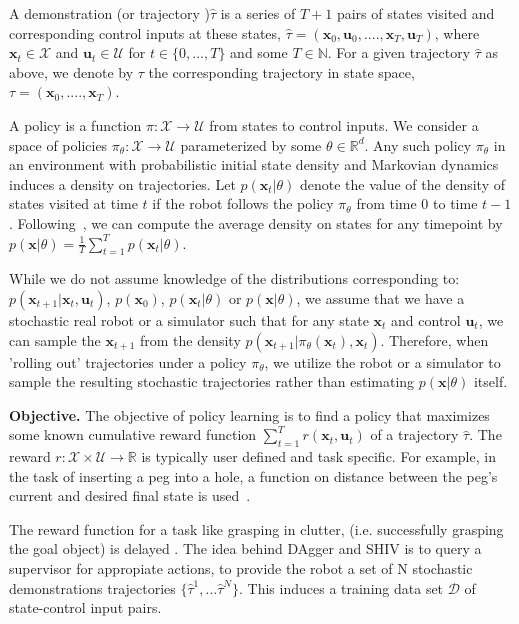 \documentclass[10pt, conference]{ieeeconf}      %
\newcommand{\bu}{\mathbf{u}}
\newcommand{\bx}{\mathbf{x}}
\begin{document}
A demonstration (or trajectory )$\hat{\tau}$ is a series of $T+1$ pairs of states visited and corresponding
control inputs at these states, $\hat{\tau} = (\mathbf{x}_0,\mathbf{u}_0, ...., \mathbf{x}_T,\mathbf{u}_T)$, where $\bx_t\in \mathcal{X}$
and $\bu_t\in \mathcal{U}$ for $t\in \{0, \ldots, T\}$ and some $T\in \mathbb{N}$.  
For a given trajectory $\hat{\tau}$ as above, we denote by ${\tau}$ the corresponding trajectory in state space,
${\tau} = (\bx_0,....,\bx_T)$.


A policy is a function $\pi: \mathcal{X} \to \mathcal{U}$ from states to control inputs. 
We consider a space of policies $\pi_{\theta}:\mathcal{X}\to \mathcal{U}$ parameterized by some $\theta\in \mathbb{R}^d$. Any such policy $\pi_{\theta}$ in an environment with probabilistic initial state density and Markovian dynamics
induces a density on trajectories. Let $p(\bx_t|\theta)$ denote the value of the density of states visited at time $t$ if the robot follows the policy
$\pi_{\theta}$ from time $0$ to time $t-1$.  Following~\cite{ross2010reduction}, we can compute
the average density on states for any timepoint by $p(\bx|\theta) = \frac{1}{T} \sum^T_{t=1} p(\bx_t|\theta)$.


While we do not assume knowledge of the distributions corresponding to: $p(\bx_{t+1}|\bx_t,\bu_t)$, $p(\bx_0)$, $p(\bx_t|
\theta)$ or $p(\bx|\theta)$, we assume that we have a stochastic real robot or a simulator such that for any state
$\bx_t$ and control $\bu_t$, we can sample the $\bx_{t+1}$ from the density $p(\bx_{t+1}|\pi_{\theta}(\bx_t),\bx_t)$. 
Therefore, when 'rolling out' trajectories under a policy
$\pi_{\theta}$, we utilize the robot or a simulator to sample the resulting stochastic trajectories rather than
estimating $p(\bx|\theta)$ itself.

\noindent\textbf{Objective.} The objective of  policy learning is to find a policy that maximizes some known cumulative reward function $\sum^T_{t=1} r(\bx_t,\bu_t)$ of a trajectory $\hat{\tau}$. The reward $r:\mathcal{X}\times \mathcal{U}\to \mathbb{R}$ is typically user defined and task specific. 
For example, in the task of inserting a peg into a hole, a function on distance between the peg's current and desired final state is used~\cite{levine2015end}.  

The reward function  for a task like grasping in clutter, (i.e.  successfully grasping the goal object) is delayed \cite{kitaevphysics}. The idea behind DAgger and SHIV is to query a supervisor for appropiate actions, to provide the robot a set of N stochastic demonstrations trajectories $\lbrace \hat{\tau}^1,...\hat{\tau}^N \rbrace$. This induces a training data set $\mathcal{D}$ of state-control input pairs. 
\end{document}
